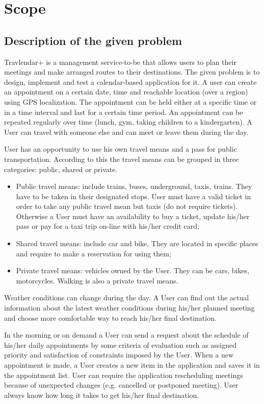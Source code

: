 \documentclass[a4paper]{book}
\begin{document}
\section{Scope}
\subsection{Description of the given problem}
Travlendar+ is a management service-to-be that allows users to plan their meetings and make  arranged routes to their destinations. The given problem is to design, implement and test a calendar-based application for it.
A user can create an appointment on a certain date, time and reachable location (over a region) using GPS localization. The appointment can be held either at a specific time or in a time interval and last for a certain time period. An appointment can be repeated regularly over time (lunch, gym, taking children to a kindergarten). A User can travel with someone else and can meet or leave them during the day.

User has an opportunity to use his own travel means and a pass for public transportation. According to this the travel means can be grouped in three categories: public, shared or private.

\begin{itemize}
	\item Public travel means: include trains, buses, underground, taxis, trains. They have to be taken in their designated stops. User must have a valid ticket in order to take any public travel mean but taxis (do not require tickets). Otherwise a User must have an availability to buy a ticket, update his/her pass or pay for a taxi trip on-line with his/her credit card;
	\item Shared travel means: include car and bike. They are located in specific places and require to make a reservation for using them;
	\item Private travel means: vehicles owned by the User. They can be cars, bikes, motorcycles. Walking is also a private travel means.
\end{itemize}

Weather conditions can change during the day. A User can find out the actual information about the latest weather conditions during his/her planned meeting and choose more comfortable way to reach his/her final destination.

In the morning or on demand a User can send a request about the schedule of his/her daily appointments by some criteria of evaluation such as assigned priority and satisfaction of constraints imposed by the User. When a new appointment is made, a User creates a new item in the application and saves it in the appointment list. User can require the application rescheduling meetings because of unexpected changes (e.g. cancelled or postponed meeting). User always know how long it takes to get his/her final destination. 
\end{document}
